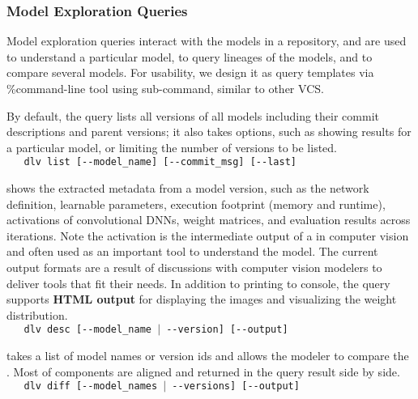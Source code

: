 \documentclass[conference]{IEEEtran}
\begin{document}
\subsubsection{Model Exploration Queries}
Model exploration queries interact with the models in a repository, and are used to
understand a particular model, to query lineages of the models, and to compare several models. 
For usability, we design it as %
query templates via \dlv\%command-line tool using 
sub-command, similar to other VCS. %


By default, the query lists all versions of all models including their commit descriptions and
parent versions; it also takes options, such as showing results for a particular model, or limiting
the number of versions to be listed. %
\\{\small{\verb|   dlv list [--model_name] [--commit_msg] [--last]|}}


 shows the extracted metadata from a model version,
    such as the network definition, learnable parameters, execution footprint (memory and runtime),
    activations of convolutional DNNs, weight matrices, and evaluation results across iterations.
    Note the activation is the intermediate output of a \dnn\model in computer vision and often
    used as an important tool to understand the model. The current output formats are a result of
    discussions with computer vision modelers to deliver tools that fit their needs. In
    addition to printing to console, the query supports {\bf HTML output} for displaying the images and visualizing the weight distribution.%
\\{\small{\verb|   dlv desc [--model_name |\texttt{$\vert$}\verb| --version] [--output]|}}


 takes a list of model names or version ids and allows the
modeler to compare the \dnn\models. Most of  components are aligned and returned in the
query result side by side. %
\\{\small{\verb|   dlv diff [--model_names |\texttt{$\vert$}\verb| --versions] [--output]|}}
\end{document}
